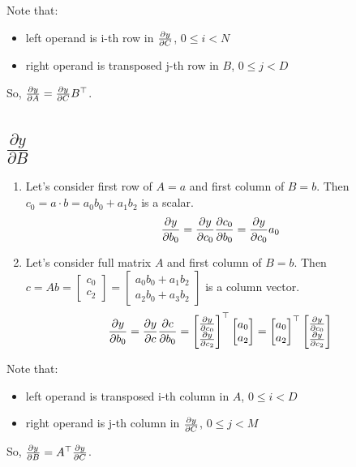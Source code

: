 \documentclass[12pt]{article}
\begin{document}
Note that:

\begin{itemize}
\item left operand is i-th row in $\pdv{y}{C}$, $0 \le i < N$
\item right operand is transposed j-th row in $B$, $0 \le j < D$  
\end{itemize}

So, $\pdv{y}{A} = \pdv{y}{C} B^\top$.

\section{$\frac{\partial y}{\partial B}$}

\begin{enumerate}
\item Let's consider first row of $A = a$ and first column of $B = b$.  
Then $c_0 = a \cdot b = a_0b_0 + a_1b_2$ is a scalar.  
\[
	\pdv{y}{b_0} = 
	\pdv{y}{c_0} \pdv{c_0}{b_0} = 
	\pdv{y}{c_0} a_0
\]
\item Let's consider full matrix $A$ and first column of $B = b$.  
Then $
c = Ab = 
\begin{bmatrix}c_0 \\ c_2\end{bmatrix} =
\begin{bmatrix}a_0b_0 + a_1b_2 \\ a_2b_0 + a_3b_2\end{bmatrix}
$ is a column vector.  
\[
	\pdv{y}{b_0} = 
	\pdv{y}{c} \pdv{c}{b_0} = 
	\begin{bmatrix}
		\pdv{y}{c_0} \\ \pdv{y}{c_2}
	\end{bmatrix} ^\top	
	\begin{bmatrix} 
		a_0 \\ a_2
	\end{bmatrix} =
	\begin{bmatrix} 
		a_0 \\ a_2
	\end{bmatrix} ^\top
	\begin{bmatrix}
		\pdv{y}{c_0} \\ \pdv{y}{c_2}
	\end{bmatrix}
\] 
\end{enumerate}

Note that:

\begin{itemize}
\item left operand is transposed i-th column in $A$, $0 \le i < D$  
\item right operand is j-th column in $\pdv{y}{C}$, $0 \le j < M$  
\end{itemize}

So, $\pdv{y}{B} = A^\top \pdv{y}{C}$.
\end{document}
